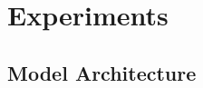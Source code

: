 \documentclass{article}
\begin{document}






\section{Experiments}
\subsection{Model Architecture}
\end{document}
